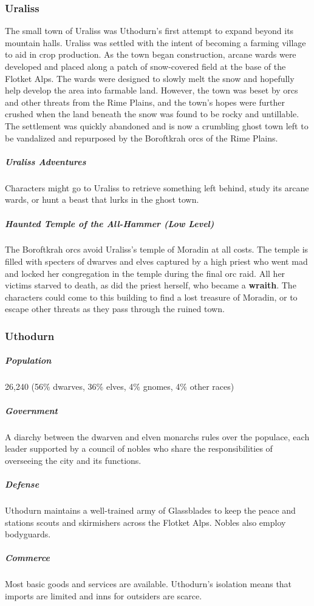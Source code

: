 \documentclass[10pt,a4paper,twoside,bg=print,twocolumn,openany,nodeprecatedcode]{dndbook}
\begin{document}
\subsubsection{Uraliss}
The small town of Uraliss was Uthodurn's first attempt to expand beyond its mountain halls. Uraliss was settled with the intent of becoming a farming village to aid in crop production. As the town began construction, arcane wards were developed and placed along a patch of snow-covered field at the base of the Flotket Alps. The wards were designed to slowly melt the snow and hopefully help develop the area into farmable land. However, the town was beset by orcs and other threats from the Rime Plains, and the town's hopes were further crushed when the land beneath the snow was found to be rocky and untillable. The settlement was quickly abandoned and is now a crumbling ghost town left to be vandalized and repurposed by the Boroftkrah orcs of the Rime Plains.

\subparagraph{Uraliss Adventures}
Characters might go to Uraliss to retrieve something left behind, study its arcane wards, or hunt a beast that lurks in the ghost town.

\subparagraph{Haunted Temple of the All-Hammer (Low Level)}
The Boroftkrah orcs avoid Uraliss's temple of Moradin at all costs. The temple is filled with specters of dwarves and elves captured by a high priest who went mad and locked her congregation in the temple during the final orc raid. All her victims starved to death, as did the priest herself, who became a \textbf{wraith}. The characters could come to this building to find a lost treasure of Moradin, or to escape other threats as they pass through the ruined town.

\subsubsection{Uthodurn}
\subparagraph{Population}
26,240 (56\% dwarves, 36\% elves, 4\% gnomes, 4\% other races)

\subparagraph{Government}
A diarchy between the dwarven and elven monarchs rules over the populace, each leader supported by a council of nobles who share the responsibilities of overseeing the city and its functions.

\subparagraph{Defense}
Uthodurn maintains a well-trained army of Glassblades to keep the peace and stations scouts and skirmishers across the Flotket Alps. Nobles also employ bodyguards.

\subparagraph{Commerce}
Most basic goods and services are available. Uthodurn's isolation means that imports are limited and inns for outsiders are scarce.
\end{document}
